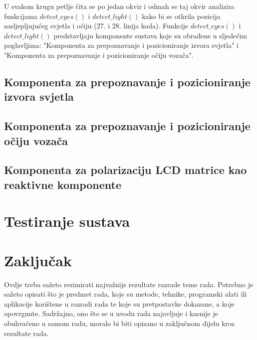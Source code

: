 \documentclass{foi}
\begin{document}
U svakom krugu petlje čita se po jedan okvir i odmah se taj okvir analizira funkcijama $detect\_eyes()$ i $detect\_light()$ kako bi se otkrila pozicija zasljepljujućeg svjetla i očiju (27. i 28. linija koda). Funkcije $detect\_eyes()$ i $detect\_light()$ predstavljaju komponente sustava koje su obrađene u sljedećim poglavljima: "Komponenta za prepoznavanje i pozicioniranje izvora svjetla" i "Komponenta za prepoznavanje i pozicioniranje očiju vozača".

\section{Komponenta za prepoznavanje i pozicioniranje izvora svjetla}

\section{Komponenta za prepoznavanje i pozicioniranje očiju vozača}

\section{Komponenta za polarizaciju LCD matrice kao reaktivne komponente}

\chapter{Testiranje sustava}

\chapter{Zaključak}

Ovdje treba sažeto rezimirati najvažnije rezultate razrade teme rada. Potrebno je sažeto opisati što je predmet rada, koje su metode, tehnike, programski alati ili aplikacije korištene u razradi rada te koje su pretpostavke dokazane, a koje opovrgnute. Sadržajno, ono što se u uvodu rada najavljuje i kasnije je obuhvaćeno u samom radu, moralo bi biti opisano u zaključnom dijelu kroz rezultate rada.

\printbibliography[title=Popis literature]

\listoffigures
{}
 
\listoftables
{}
\end{document}
